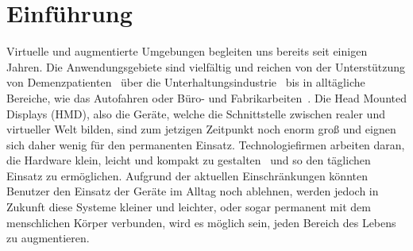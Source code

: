 \chapter{Einführung}
Virtuelle und augmentierte Umgebungen begleiten uns bereits seit einigen Jahren. Die Anwendungsgebiete sind vielfältig und reichen von der Unterstützung von Demenzpatienten~\cite{flynn2003developing, hayhurst2018augmented} über die Unterhaltungsindustrie~\cite{hughes2005mixed} bis in alltägliche Bereiche, wie das Autofahren oder Büro- und Fabrikarbeiten~\cite{medenica2011augmented, caudell1992augmented}. 
Die Head Mounted Displays (HMD), also die Geräte, welche die Schnittstelle zwischen realer und virtueller Welt bilden, sind zum jetzigen Zeitpunkt noch enorm groß und eignen sich daher wenig für den permanenten Einsatz. Technologiefirmen arbeiten daran, die Hardware klein, leicht und kompakt zu gestalten~\cite{shibata2002head, sugihara2012head} und so den täglichen Einsatz zu ermöglichen.
Aufgrund der aktuellen Einschränkungen könnten Benutzer den Einsatz der Geräte im Alltag noch ablehnen, werden jedoch in Zukunft diese Systeme kleiner und leichter, oder sogar permanent mit dem menschlichen Körper verbunden, wird es möglich sein, jeden Bereich des Lebens zu augmentieren. 
